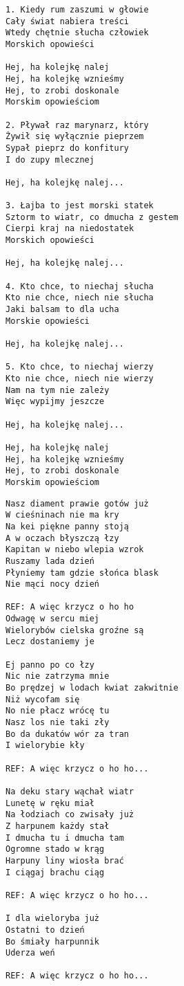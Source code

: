 \documentclass[12pt]{article}
\begin{document}
\begin{verbatim}
1. Kiedy rum zaszumi w głowie
Cały świat nabiera treści
Wtedy chętnie słucha człowiek
Morskich opowieści

Hej, ha kolejkę nalej
Hej, ha kolejkę wznieśmy
Hej, to zrobi doskonale
Morskim opowieściom

2. Pływał raz marynarz, który
Żywił się wyłącznie pieprzem
Sypał pieprz do konfitury
I do zupy mlecznej

Hej, ha kolejkę nalej...

3. Łajba to jest morski statek
Sztorm to wiatr, co dmucha z gestem
Cierpi kraj na niedostatek
Morskich opowieści

Hej, ha kolejkę nalej...

4. Kto chce, to niechaj słucha
Kto nie chce, niech nie słucha
Jaki balsam to dla ucha
Morskie opowieści

Hej, ha kolejkę nalej...

5. Kto chce, to niechaj wierzy
Kto nie chce, niech nie wierzy
Nam na tym nie zależy
Więc wypijmy jeszcze

Hej, ha kolejkę nalej...

Hej, ha kolejkę nalej
Hej, ha kolejkę wznieśmy
Hej, to zrobi doskonale
Morskim opowieściom
\end{verbatim}
\clearpage

\begin{verbatim}
Nasz diament prawie gotów już
W cieśninach nie ma kry
Na kei piękne panny stoją
A w oczach błyszczą łzy
Kapitan w niebo wlepia wzrok
Ruszamy lada dzień
Płyniemy tam gdzie słońca blask
Nie mąci nocy dzień

REF: A więc krzycz o ho ho
Odwagę w sercu miej
Wielorybów cielska groźne są
Lecz dostaniemy je

Ej panno po co łzy
Nic nie zatrzyma mnie
Bo prędzej w lodach kwiat zakwitnie
Niż wycofam się
No nie płacz wrócę tu
Nasz los nie taki zły
Bo da dukatów wór za tran
I wielorybie kły

REF: A więc krzycz o ho ho...

Na deku stary wąchał wiatr
Lunetę w ręku miał
Na łodziach co zwisały już
Z harpunem każdy stał
I dmucha tu i dmucha tam
Ogromne stado w krąg
Harpuny liny wiosła brać
I ciągaj brachu ciąg

REF: A więc krzycz o ho ho...

I dla wieloryba już
Ostatni to dzień
Bo śmiały harpunnik
Uderza weń

REF: A więc krzycz o ho ho...
\end{verbatim}
\clearpage
\end{document}
